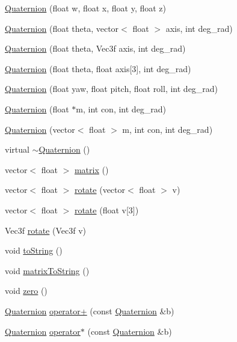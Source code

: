 \begin{DoxyCompactItemize}
\item 
\hyperlink{classQuaternion_ab13d6ced50c96438115b30cb91fc7d6c}{Quaternion} (float w, float x, float y, float z)
\item 
\hyperlink{classQuaternion_afe6d67aea9571b86269759a5dcbbd5b1}{Quaternion} (float theta, vector$<$ float $>$ axis, int deg\-\_\-rad)
\item 
\hyperlink{classQuaternion_a461289c049488237fe600ac93d7d18e2}{Quaternion} (float theta, Vec3f axis, int deg\-\_\-rad)
\item 
\hyperlink{classQuaternion_a951d6f03907e0fd81f87a821aa65eed1}{Quaternion} (float theta, float axis\mbox{[}3\mbox{]}, int deg\-\_\-rad)
\item 
\hyperlink{classQuaternion_af2d1bdc0d28bb9630259514d34a89b13}{Quaternion} (float yaw, float pitch, float roll, int deg\-\_\-rad)
\item 
\hyperlink{classQuaternion_a5caa2f853088db9a9ae4920afb907461}{Quaternion} (float $\ast$m, int con, int deg\-\_\-rad)
\item 
\hyperlink{classQuaternion_a458226b80dece68afe44fcd5cc460ae0}{Quaternion} (vector$<$ float $>$ m, int con, int deg\-\_\-rad)
\item 
virtual \hyperlink{classQuaternion_a5f834c2ca469cd71edc8a23fdc3f56e8}{$\sim$\-Quaternion} ()
\item 
vector$<$ float $>$ \hyperlink{classQuaternion_a10c72e67c80150f4419be5a616575ca4}{matrix} ()
\item 
vector$<$ float $>$ \hyperlink{classQuaternion_aff3eac8f2ff148c399fa39e16594ce1f}{rotate} (vector$<$ float $>$ v)
\item 
vector$<$ float $>$ \hyperlink{classQuaternion_a341d532ec38393c75673d1b3a3ec9e2f}{rotate} (float v\mbox{[}3\mbox{]})
\item 
Vec3f \hyperlink{classQuaternion_a780954aaa6a274f980f1af7f016d4570}{rotate} (Vec3f v)
\item 
void \hyperlink{classQuaternion_aa3bbfe668e104769f47344dc6e63eb5b}{to\-String} ()
\item 
void \hyperlink{classQuaternion_a0bf91c04839f665014253c74a0461461}{matrix\-To\-String} ()
\item 
void \hyperlink{classQuaternion_a5be74768bcc366ea59a9c6adffdcdd4e}{zero} ()
\item 
\hyperlink{classQuaternion}{Quaternion} \hyperlink{classQuaternion_a8ab54a1bd23bcbb4476c831f7c0068a2}{operator+} (const \hyperlink{classQuaternion}{Quaternion} \&b)
\item 
\hyperlink{classQuaternion}{Quaternion} \hyperlink{classQuaternion_af29f524832881bd5d63d5ab91d45f4ec}{operator$\ast$} (const \hyperlink{classQuaternion}{Quaternion} \&b)

\end{DoxyCompactItemize}
